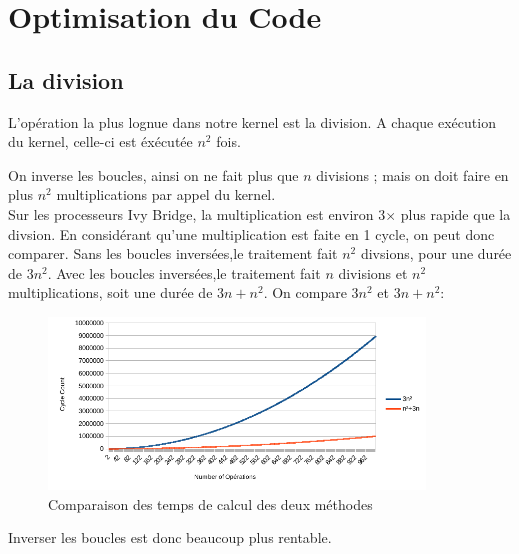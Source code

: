 \documentclass{report}
\begin{document}
\section*{Optimisation du Code}
\subsection*{La division}

L'opération la plus lognue dans notre kernel est la division. A chaque exécution du kernel, celle-ci est éxécutée $n^2$ fois.

On inverse les boucles, ainsi on ne fait plus que $n$ divisions ; mais on doit faire en plus $n^2$ multiplications par appel du kernel.
\\Sur les processeurs Ivy Bridge, la multiplication est environ 3$\times$ plus rapide que la divsion. En considérant qu'une multiplication est faite en 1 cycle, on peut donc comparer.
Sans les boucles inversées,le traitement fait $n^2$ divsions, pour une durée de $3n^2$.
Avec les boucles inversées,le traitement fait $n$ divisions et $n^2$ multiplications, soit une durée de $3n+n^2$.
On compare $3n^2$ et $3n+n^2$:\\
\begin{figure}[ht!]
    \centering
    \includegraphics[width=100mm]{MEDIA/div_vs_mult_graph.png}
    \caption{Comparaison des temps de calcul des deux méthodes}
\end{figure}
Inverser les boucles est donc beaucoup plus rentable.
\end{document}
